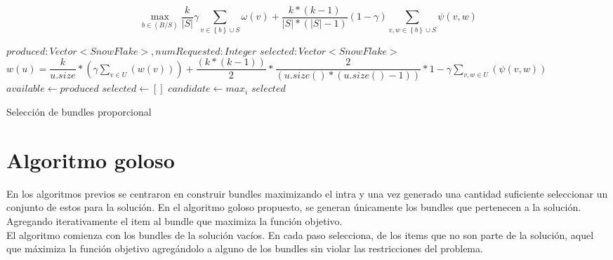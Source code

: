 \begin{equation}
\max_{b \in (B/S)}{\dfrac{k}{|S|}} \gamma \sum_{v \in \left\{b\right\} \cup S}{\omega(v)} + \dfrac{k * (k-1)}{|S| * (|S|-1)} (1-\gamma) \sum_{v,w \in \left\{b\right\} \cup S}{\psi(v,w)}
\end{equation}

\begin{algorithm}[H]
\begin{algorithmic}[1]
\REQUIRE $produced:Vector<SnowFlake>, numRequested:Integer$
\ENSURE $selected:Vector<SnowFlake>$
\STATE $w(u) = \dfrac{k}{u.size} * (\gamma \sum_{v \in U}(w(v))) + \dfrac{(k * (k-1))}{2} * \dfrac{2}{(u.size() * (u.size() - 1))} * 1 - \gamma \sum_{v,w \in U}(\psi(v,w))$
\STATE $available \leftarrow produced$
\STATE $selected \leftarrow []$
\STATE $candidate \leftarrow max_{i}$
\ENDWHILE
\RETURN $selected$
\end{algorithmic}
\caption{Selección de bundles proporcional}\label{alg:algSelProp}
\end{algorithm}

\section{Algoritmo goloso}
En los algoritmos previos se centraron en construir bundles maximizando el intra y una vez generado una cantidad suficiente seleccionar un conjunto de estos para la solución. En el algoritmo goloso propuesto, se generan únicamente los bundles que pertenecen a la solución. Agregando iterativamente el item al bundle que maximiza la función objetivo.\\
El algoritmo comienza con los bundles de la solución vacíos. En cada paso selecciona, de los items que no son parte de la solución, aquel que máximiza la función objetivo agregándolo a alguno de los bundles sin violar las restricciones del problema.

